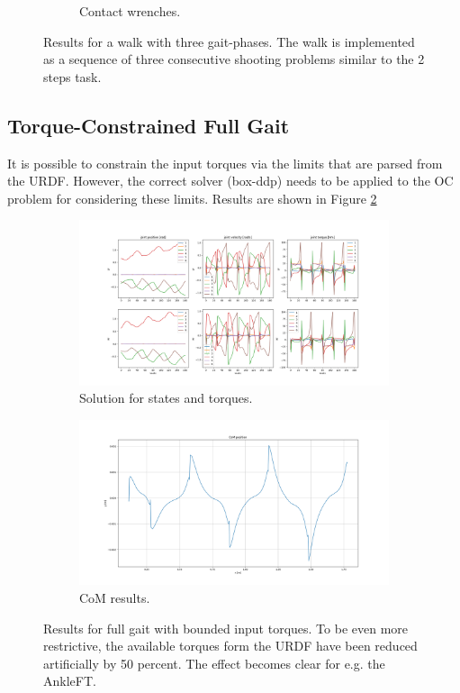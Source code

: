 \begin{figure}[h!]
\begin{subfigure}{.5\textwidth}
\caption{Contact wrenches.}
\end{subfigure}
\caption{Results for a walk with three gait-phases. The walk is implemented as a sequence of three  consecutive shooting problems similar to the 2 steps task.}
\label{fig:rh5_full_gait}
\centering
\end{figure}

\subsection{Torque-Constrained Full Gait}
It is possible to constrain the input torques via the limits that are parsed from the URDF. However, the correct solver (box-ddp) needs to be applied to the OC problem for considering these limits.  Results are shown in Figure \ref{fig:rh5_constrain_torque}
\begin{figure}[h!]
\centering
\begin{subfigure}{.8\textwidth}
  \centering
  \includegraphics[width=1\linewidth]{Media/Crocoddyl/RH5Legs/BoundedInput/RH5GaitUbound50Percent_Solution.png}
  \caption{Solution for states and torques.}
\end{subfigure}
\begin{subfigure}{.8\textwidth}
  \centering
\includegraphics[width=1\linewidth]{Media/Crocoddyl/RH5Legs/BoundedInput/RH5GaitUbound50Percent_CoM.png}
\caption{CoM results.}
\end{subfigure}
\caption{Results for full gait with bounded input torques. To be even more restrictive, the available torques form the URDF have been reduced artificially by 50 percent. The effect becomes clear for e.g. the AnkleFT.}
\label{fig:rh5_constrain_torque}
\centering
\end{figure}

